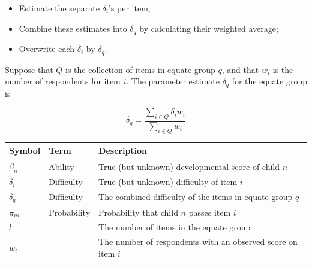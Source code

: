\documentclass[
]{book}
\providecommand{\tightlist}{%
  \setlength{\itemsep}{0pt}\setlength{\parskip}{0pt}}
\begin{document}
\begin{itemize}
\tightlist
\item
  Estimate the separate \(\delta_i\)'s per item;
\item
  Combine these estimates into \(\delta_q\) by calculating their weighted average;
\item
  Overwrite each \(\delta_i\) by \(\delta_q\).
\end{itemize}

Suppose that \(Q\) is the collection of items in equate group \(q\), and that \(w_i\) is the number of respondents for item \(i\). The parameter estimate \(\delta_q\) for the equate group is

\begin{equation}
\delta_q = \frac{\sum_{i\in Q} \delta_iw_i}{\sum_{i\in Q} w_i} \label{eq:raschequate}
\end{equation}

\begin{longtable}[]{@{}lll@{}}
\toprule
Symbol & Term & Description\tabularnewline
\midrule
\endhead
\(\beta_n\) & Ability & True (but unknown) developmental score of child \(n\)\tabularnewline
\(\delta_i\) & Difficulty & True (but unknown) difficulty of item \(i\)\tabularnewline
\(\delta_q\) & Difficulty & The combined difficulty of the items in equate group \(q\)\tabularnewline
\(\pi_{ni}\) & Probability & Probability that child \(n\) passes item \(i\)\tabularnewline
\(l\) & & The number of items in the equate group\tabularnewline
\(w_i\) & & The number of respondents with an observed score on item \(i\)\tabularnewline
\bottomrule
\end{longtable}
\end{document}
